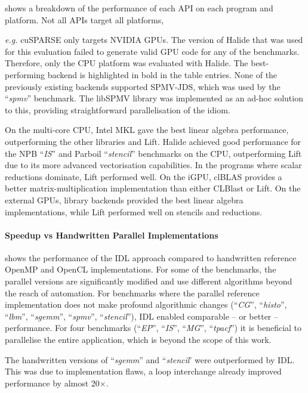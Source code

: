      shows a breakdown of the performance of each API
    on each program and platform.
    Not all APIs target all platforms, {\emph{e.g.} cuSPARSE only targets NVIDIA
    GPUs.
    The version of Halide that was used for this evaluation failed to generate
    valid GPU code for any of the benchmarks.
    Therefore, only the CPU platform was evaluated with Halide.
    The best-performing backend is highlighted in bold in the table entries.
    None of the previously existing backends supported SPMV-JDS, which was used
    by the ``\emph{spmv}'' benchmark.
    The libSPMV library was implemented as an ad-hoc solution to this,
    providing straightforward parallelisation of the idiom.

    On the multi-core CPU, Intel MKL gave the best linear algebra performance,
    outperforming the other libraries and Lift.
    Halide achieved good performance for the NPB ``\emph{IS}'' and Parboil
    ``\emph{stencil}'' benchmarks on the CPU, outperforming Lift due to its more
    advanced vectorisation capabilities.
    In the programs where scalar reductions dominate, Lift performed well.
    On the iGPU, clBLAS provides a better matrix-multiplication implementation
    than either CLBlast or Lift.
    On the external GPUs, library backends provided the best linear algebra
    implementations, while Lift performed well on stencils and reductions.

\paragraph*{Speedup vs Handwritten Parallel Implementations}

     shows the performance of the IDL approach
    compared to handwritten reference OpenMP and OpenCL implementations.
    For some of the benchmarks, the parallel versions are significantly modified
    and use different algorithms beyond the reach of automation.
    For benchmarks where the parallel reference implementation does not make
    profound algorithmic changes (``\emph{CG}'', ``\emph{histo}'',
    ``\emph{lbm}'', ``\emph{sgemm}'', ``\emph{spmv}'', ``\emph{stencil}''),
    IDL enabled comparable -- or better -- performance.
    For four benchmarks (``\emph{EP}'', ``\emph{IS}'', ``\emph{MG}'',
   ``\emph{tpacf}'') it is beneficial to parallelise the entire application,
    which is beyond the scope of this work.

    The handwritten versions of ``\emph{sgemm}'' and ``\emph{stencil}' were
    outperformed by IDL.
    This was due to implementation flaws, a loop interchange already improved
    performance by almost 20$\times$.

}
